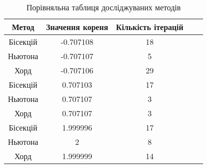 \begin{table}[h!]
    \centering
    \begin{tabular}{|c|c|c|c|c|}
        \hline
        \textbf{Метод} & \textbf{Значення кореня} & \textbf{Кількість ітерацій} \\
        \hline
        Бісекцій & -0.707108 & 18 \\
        \hline
        Ньютона & -0.707107 & 5 \\
        \hline
        Хорд & -0.707106 & 29 \\
        \hline
        \hline
        Бісекцій & 0.707103 & 17 \\
        \hline
        Ньютона & 0.707107 & 3 \\
        \hline
        Хорд & 0.707107 & 3 \\
        \hline
        \hline
        Бісекцій & 1.999996 & 17 \\
        \hline
        Ньютона & 2 & 8 \\
        \hline
        Хорд & 1.999999 & 14 \\
        \hline
    \end{tabular}
    \caption{Порівняльна таблиця досліджуваних методів}
\end{table}
